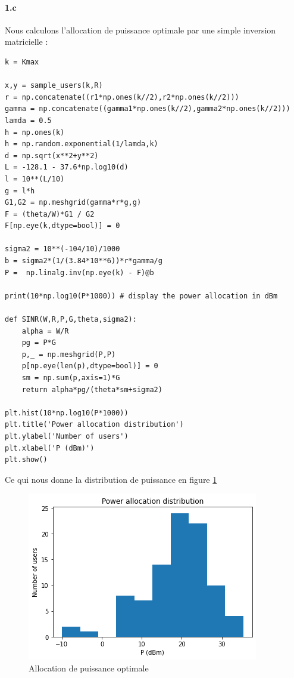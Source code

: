 \documentclass[a4paper,11pt,2]{article}
\begin{document}
\paragraph{1.c} Nous calculons l'allocation de puissance optimale par une simple inversion matricielle :
\begin{center}
\begin{lstlisting}
k = Kmax

x,y = sample_users(k,R)
r = np.concatenate((r1*np.ones(k//2),r2*np.ones(k//2)))
gamma = np.concatenate((gamma1*np.ones(k//2),gamma2*np.ones(k//2)))
lamda = 0.5
h = np.ones(k)
h = np.random.exponential(1/lamda,k)
d = np.sqrt(x**2+y**2)
L = -128.1 - 37.6*np.log10(d)
l = 10**(L/10)
g = l*h
G1,G2 = np.meshgrid(gamma*r*g,g)
F = (theta/W)*G1 / G2
F[np.eye(k,dtype=bool)] = 0

sigma2 = 10**(-104/10)/1000
b = sigma2*(1/(3.84*10**6))*r*gamma/g
P =  np.linalg.inv(np.eye(k) - F)@b

print(10*np.log10(P*1000)) # display the power allocation in dBm

def SINR(W,R,P,G,theta,sigma2):
    alpha = W/R
    pg = P*G
    p,_ = np.meshgrid(P,P)
    p[np.eye(len(p),dtype=bool)] = 0
    sm = np.sum(p,axis=1)*G
    return alpha*pg/(theta*sm+sigma2)

plt.hist(10*np.log10(P*1000))
plt.title('Power allocation distribution')
plt.ylabel('Number of users')
plt.xlabel('P (dBm)')
plt.show()
\end{lstlisting}
\end{center}

Ce qui nous donne la distribution de puissance en figure \ref{fig:II1c}
\begin{figure}[h]
\centering
\includegraphics[width=0.7\linewidth]{./Images/II-1c.png}
\caption{Allocation de puissance optimale}
\label{fig:II1c}
\end{figure}
\end{document}
